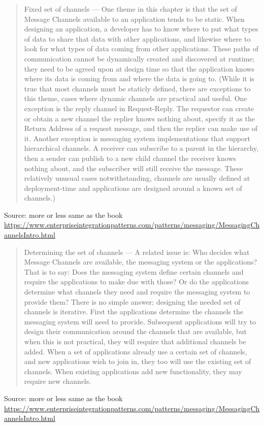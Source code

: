 \documentclass[Screen16to9,17pt]{foils}
\begin{document}


\begin{quote}\small
Fixed set of channels — One theme in this chapter is that the set of Message Channels available to an application tends to be static. When designing an application, a developer has to know where to put what types of data to share that data with other applications, and likewise where to look for what types of data coming from other applications. These paths of communication cannot be dynamically created and discovered at runtime; they need to be agreed upon at design time so that the application knows where its data is coming from and where the data is going to. (While it is true that most channels must be staticly defined, there are exceptions to this theme, cases where dynamic channels are practical and useful. One exception is the reply channel in Request-Reply. The requestor can create or obtain a new channel the replier knows nothing about, specify it as the Return Address of a request message, and then the replier can make use of it. Another exception is messaging system implementations that support hierarchical channels. A receiver can subscribe to a parent in the hierarchy, then a sender can publish to a new child channel the receiver knows nothing about, and the subscriber will still receive the message. These relatively unusual cases notwithstanding, channels are usually defined at deployment-time and applications are designed around a known set of channels.)
\end{quote}
Source:  more or less same as the book\\{\footnotesize \url{https://www.enterpriseintegrationpatterns.com/patterns/messaging/MessagingChannelsIntro.html}}



\begin{quote}\small
Determining the set of channels — A related issue is: Who decides what Message Channels are available, the messaging system or the applications? That is to say: Does the messaging system define certain channels and require the applications to make due with those? Or do the applications determine what channels they need and require the messaging system to provide them? There is no simple answer; designing the needed set of channels is iterative. First the applications determine the channels the messaging system will need to provide. Subsequent applications will try to design their communication around the channels that are available, but when this is not practical, they will require that additional channels be added. When a set of applications already use a certain set of channels, and new applications wish to join in, they too will use the existing set of channels. When existing applications add new functionality, they may require new channels.
\end{quote}
Source:  more or less same as the book\\{\footnotesize \url{https://www.enterpriseintegrationpatterns.com/patterns/messaging/MessagingChannelsIntro.html}}
\end{document}
